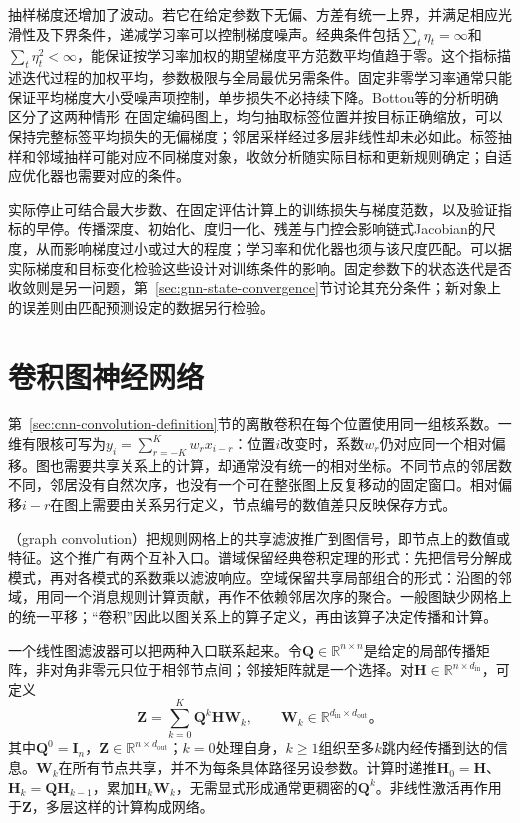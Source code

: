 抽样梯度还增加了波动。若它在给定参数下无偏、方差有统一上界，并满足相应光滑性及下界条件，递减学习率可以控制梯度噪声。经典条件包括$\sum_t\eta_t=\infty$和$\sum_t\eta_t^2<\infty$，能保证按学习率加权的期望梯度平方范数平均值趋于零。这个指标描述迭代过程的加权平均，参数极限与全局最优另需条件。固定非零学习率通常只能保证平均梯度大小受噪声项控制，单步损失不必持续下降。Bottou等的分析明确区分了这两种情形 在固定编码图上，均匀抽取标签位置并按目标正确缩放，可以保持完整标签平均损失的无偏梯度；邻居采样经过多层非线性却未必如此。标签抽样和邻域抽样可能对应不同梯度对象，收敛分析随实际目标和更新规则确定；自适应优化器也需要对应的条件。

实际停止可结合最大步数、在固定评估计算上的训练损失与梯度范数，以及验证指标的早停。传播深度、初始化、度归一化、残差与门控会影响链式Jacobian的尺度，从而影响梯度过小或过大的程度；学习率和优化器也须与该尺度匹配。可以据实际梯度和目标变化检验这些设计对训练条件的影响。固定参数下的状态迭代是否收敛则是另一问题，第~\ref{sec:gnn-state-convergence}节讨论其充分条件；新对象上的误差则由匹配预测设定的数据另行检验。

\section{卷积图神经网络}
\label{sec:gnn-convolutional}

第~\ref{sec:cnn-convolution-definition}节的离散卷积在每个位置使用同一组核系数。一维有限核可写为$y_i=\sum_{r=-K}^{K}w_r x_{i-r}$：位置$i$改变时，系数$w_r$仍对应同一个相对偏移。图也需要共享关系上的计算，却通常没有统一的相对坐标。不同节点的邻居数不同，邻居没有自然次序，也没有一个可在整张图上反复移动的固定窗口。相对偏移$i-r$在图上需要由关系另行定义，节点编号的数值差只反映保存方式。

（graph convolution）把规则网格上的共享滤波推广到图信号，即节点上的数值或特征。这个推广有两个互补入口。谱域保留经典卷积定理的形式：先把信号分解成模式，再对各模式的系数乘以滤波响应。空域保留共享局部组合的形式：沿图的邻域，用同一个消息规则计算贡献，再作不依赖邻居次序的聚合。一般图缺少网格上的统一平移；“卷积”因此以图关系上的算子定义，再由该算子决定传播和计算。

一个线性图滤波器可以把两种入口联系起来。令$\bm{Q}\in\mathbb{R}^{n\times n}$是给定的局部传播矩阵，非对角非零元只位于相邻节点间；邻接矩阵就是一个选择。对$\bm{H}\in\mathbb{R}^{n\times d_{\mathrm{in}}}$，可定义
\begin{equation}
  \bm{Z}=\sum_{k=0}^{K}\bm{Q}^{k}\bm{H}\bm{W}_k,
  \qquad \bm{W}_k\in\mathbb{R}^{d_{\mathrm{in}}\times d_{\mathrm{out}}}\text{。}
  \label{eq:gnn-polynomial-convolution}
\end{equation}
其中$\bm{Q}^0=\bm{I}_n$，$\bm{Z}\in\mathbb{R}^{n\times d_{\mathrm{out}}}$；$k=0$处理自身，$k\geq1$组织至多$k$跳内经传播到达的信息。$\bm{W}_k$在所有节点共享，并不为每条具体路径另设参数。计算时递推$\bm{H}_0=\bm{H}$、$\bm{H}_k=\bm{Q}\bm{H}_{k-1}$，累加$\bm{H}_k\bm{W}_k$，无需显式形成通常更稠密的$\bm{Q}^k$。非线性激活再作用于$\bm{Z}$，多层这样的计算构成网络。

